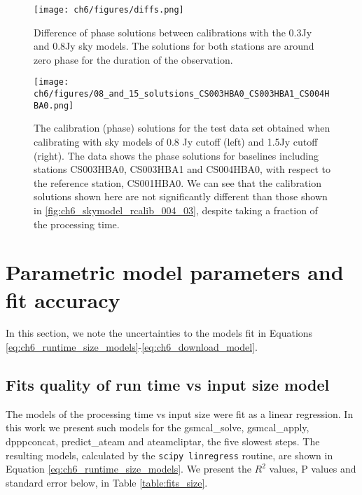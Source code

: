 \begin{subappendices}
\begin{figure}
    \texttt{[image: ch6/figures/diffs.png]}
      \caption[Calibration solution differences between two skymodels]{Difference of phase solutions between calibrations with the 0.3Jy and 0.8Jy sky models. The solutions for both stations are around zero phase for the duration of the observation.}
	\label{fig:ch6_diffs_solutions}
\end{figure}

\begin{figure}
    \texttt{[image: ch6/figures/08\_and\_15\_solutsions\_CS003HBA0\_CS003HBA1\_CS004HBA0.png]}
      \caption[Calibration solutions for sky models with high flux cutoff]{The calibration (phase) solutions for the test data set obtained when calibrating with sky models of 0.8 Jy cutoff (left) and 1.5Jy cutoff (right). The data shows the phase solutions for baselines including stations CS003HBA0, CS003HBA1 and CS004HBA0, with respect to the reference station, CS001HBA0. We can see that the calibration solutions shown here are not significantly different than those shown in \ref{fig:ch6_skymodel_rcalib_004_03}, despite taking a fraction of the processing time.  }
	\label{fig:ch6_skymodel_rcalib_08_15}
\end{figure}

\section{Parametric model parameters and fit accuracy}\label{ap:ch6_model_params}

In this section, we note the uncertainties to the models fit in Equations \ref{eq:ch6_runtime_size_models}-\ref{eq:ch6_download_model}. 

\setcounter{equation}{6}
\renewcommand{\theequation}{\Alph{section}.\arabic{equation}}

\subsection{Fits quality of run time vs input size model}

The models of the processing time vs input size were fit as a linear regression. In this work we present such models for the {\selectfont  gsmcal\_solve}, {\selectfont gsmcal\_apply}, {\selectfont dpppconcat}, {\selectfont predict\_ateam} and {\selectfont ateamcliptar}, the five slowest steps. The resulting models, calculated by the \texttt{scipy linregress}\citep{scipy} routine, are shown in Equation \ref{eq:ch6_runtime_size_models}. We present the $R^2$ values, P values and standard error below, in Table \ref{table:fits_size}.




\end{subappendices}

